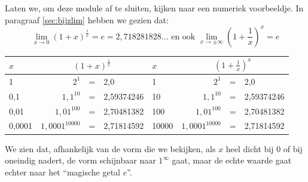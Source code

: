Laten we, om deze module af te sluiten, kijken naar een
numeriek voorbeeldje. In paragraaf \ref{sec:bijzlim}
hebben we gezien dat: 
\begin{equation*}
{\displaystyle \lim_{x\to0}}\left(1+x\right)^{\frac{1}{x}}=e=2,718281828...
\text{ en ook }{\displaystyle \lim_{x\to\pm\infty}}\left(1+\frac{1}{x}\right)^{x}=e
\end{equation*}

\begin{table}[ht]
\centering
\begin{tabular}{lrcl|lrcl}
	$x$ & \multicolumn{3}{c|}{$\left(1+x\right)^{\frac{1}{x}}$}  & $x$ & \multicolumn{3}{c}{$\left(1+\frac{1}{x}\right)^{x}$}\\
	\hline 
	1 & $2^{1}$ & = & 2,0  & 1 & $2^{1}$ & = & 2,0\\
	0,1 & $1,1^{10}$ & = & 2,59374246  & 10 & $1,1^{10}$ & = & 2,59374246\\
	0,01 & $1,01^{100}$ & = & 2,70481382  & 100 & $1,01^{100}$ & = & 2,70481382\\
	0,0001 & $1,0001^{10000}$ & = & 2,71814592  & 10000 & $1,0001^{10000}$ & = & 2,71814592\\
\end{tabular}
\end{table}



We zien dat, afhankelijk van de vorm die we bekijken, als
$x$ heel dicht bij $0$ of bij oneindig nadert, de vorm schijnbaar
naar $1^{\infty}$ gaat, maar de echte waarde gaat echter naar het
``magische getal $e$''.

